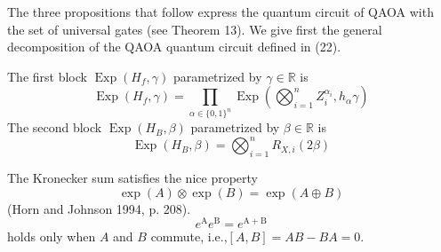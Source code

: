 The three propositions that follow express the quantum circuit of QAOA with the set of universal gates (see Theorem 13). We give first the general decomposition of the QAOA quantum circuit defined in (22).

\begin{proposition}
    The first block $\operatorname{Exp}\left(H_{f}, \gamma\right)$ parametrized by $\gamma \in \mathbb{R}$ is
\begin{equation}
    \operatorname{Exp}\left(H_{f}, \gamma\right)=\prod_{\alpha \in\{0,1\}^{n}} \operatorname{Exp}\left(\bigotimes_{i=1}^{n} Z_{i}^{\alpha_{i}}, h_{\alpha} \gamma\right)
\end{equation}
The second block $\operatorname{Exp}\left(H_{B}, \beta\right)$ parametrized by $\beta \in \mathbb{R}$ is
\begin{equation}
    \operatorname{Exp}\left(H_{B}, \beta\right)=\bigotimes_{i=1}^{n} R_{X, i}(2 \beta)
\end{equation}
\end{proposition}

\begin{remark}
    The Kronecker sum satisfies the nice property
\begin{equation}
    \exp (A) \otimes \exp (B)=\exp (A \oplus B)
\end{equation}
(Horn and Johnson 1994, p. 208).
\begin{equation}
    e^{\mathrm{A}} e^{\mathrm{B}}=e^{\mathrm{A}+\mathrm{B}}
\end{equation}
holds only when $A$ and $B$ commute, i.e.,$[A, B]=A B-B A=0.$
\end{remark}

